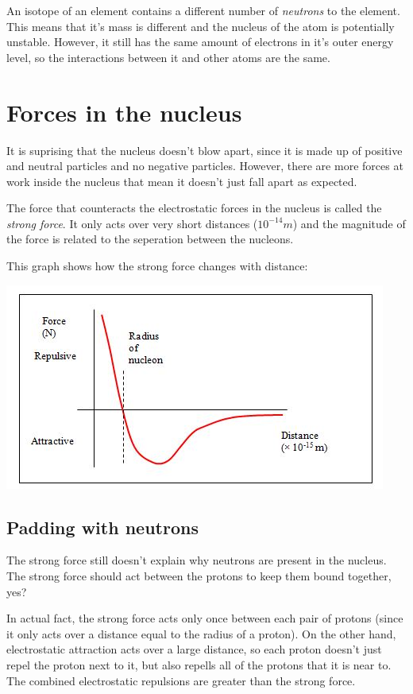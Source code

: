 \documentclass{article}
\begin{document}
An isotope of an element contains a different number of {\it neutrons} to the
element. This means that it's mass is different and the nucleus of the atom is
potentially unstable. However, it still has the same amount of electrons in it's
outer energy level, so the interactions between it and other atoms are the same.

\section*{Forces in the nucleus}

It is suprising that the nucleus doesn't blow apart, since it is made up of
positive and neutral particles and no negative particles. However, there are
more forces at work inside the nucleus that mean it doesn't just fall apart as
expected.

The force that counteracts the electrostatic forces in the nucleus is called the
{\it strong force}. It only acts over very short distances ($10^{-14}m$) and the
magnitude of the force is related to the seperation between the nucleons.

This graph shows how the strong force changes with distance:

\begin{center}
	\includegraphics{strong_force_graph}
\end{center}

\subsection*{Padding with neutrons}

The strong force still doesn't explain why neutrons are present in the nucleus.
The strong force should act between the protons to keep them bound together,
yes?

In actual fact, the strong force acts only once between each pair of protons
(since it only acts over a distance equal to the radius of a proton). On the
other hand, electrostatic attraction acts over a large distance, so each proton
doesn't just repel the proton next to it, but also repells all of the protons
that it is near to. The combined electrostatic repulsions are greater than the
strong force.
\end{document}
